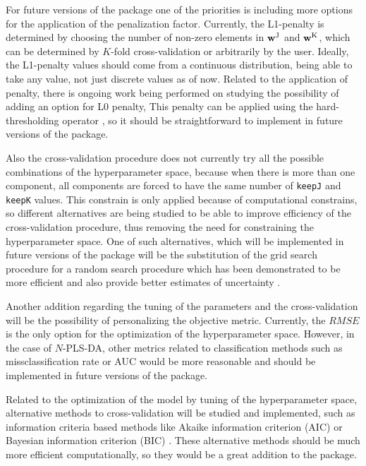 For future versions of the package one of the priorities is including more options for the application of the penalization factor. Currently, the L1-penalty is determined by choosing the number of non-zero elements in $\textbf{\text{w}}^\text{J}$ and $\textbf{\text{w}}^\text{K}$, which can be determined by $K$-fold cross-validation or arbitrarily by the user. Ideally, the L1-penalty values should come from a continuous distribution, being able to take any value, not just discrete values as of now. Related to the application of penalty, there is ongoing work being performed on studying the possibility of adding an option for L0 penalty, This penalty can be applied using the hard-thresholding operator \parencite{zou2006adaptive}, so it should be straightforward to implement in future versions of the package.

Also the cross-validation procedure does not currently try all the possible combinations of the hyperparameter space, because when there is more than one component, all components are forced to have the same number of \texttt{keepJ} and \texttt{keepK} values. This constrain is only applied because of computational constrains, so different alternatives are being studied to be able to improve efficiency of the cross-validation procedure, thus removing the need for constraining the hyperparameter space. One of such alternatives, which will be implemented in future versions of the package will be the substitution of the grid search procedure for a random search procedure which has been demonstrated to be more efficient and also provide better estimates of uncertainty \parencite{bergstra2012random}.

Another addition regarding the tuning of the parameters and the cross-validation will be the possibility of personalizing the objective metric. Currently, the $RMSE$ is the only option for the optimization of the hyperparameter space. However, in the case of $N$-PLS-DA, other metrics related to classification methods such as missclassification rate or AUC \parencite{bradley1997use} would be more reasonable and should be implemented in future versions of the package.

Related to the optimization of the model by tuning of the hyperparameter space, alternative methods to cross-validation will be studied and implemented, such as information criteria based methods like Akaike information criterion (AIC) \parencite{akaike1974new} or Bayesian information criterion (BIC) \parencite{schwarz1978estimating}. These alternative methods should be much more efficient computationally, so they would be a great addition to the package.

